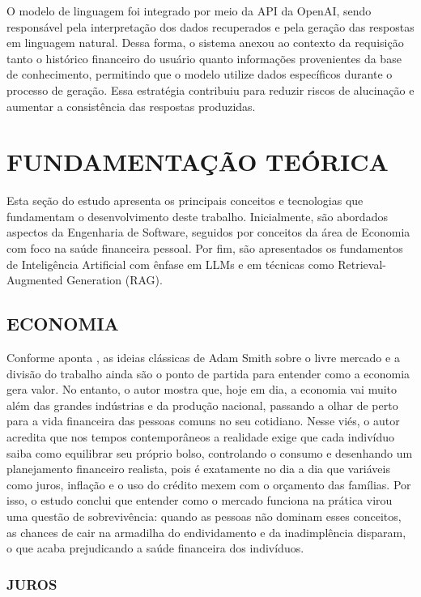 \documentclass[12pt]{article}
\begin{document}
    O modelo de linguagem foi integrado por meio da API da OpenAI, sendo responsável pela interpretação dos dados recuperados e pela geração das respostas em linguagem natural. Dessa forma, o sistema anexou ao contexto da requisição tanto o histórico financeiro do usuário quanto informações provenientes da base de conhecimento, permitindo que o modelo utilize dados específicos durante o processo de geração. Essa estratégia contribuiu para reduzir riscos de alucinação e aumentar a consistência das respostas produzidas.


\section{FUNDAMENTAÇÃO TEÓRICA}

Esta seção do estudo apresenta os principais conceitos e tecnologias que fundamentam o desenvolvimento deste trabalho. Inicialmente, são abordados aspectos da Engenharia de Software, seguidos por conceitos da área de Economia com foco na saúde financeira pessoal. Por fim, são apresentados os fundamentos de Inteligência Artificial com ênfase em LLMs e em técnicas como Retrieval-Augmented Generation (RAG).

  \subsection{ECONOMIA}
  Conforme aponta \cite{marchevsky2023gramatica}, as ideias clássicas de Adam Smith sobre o livre mercado e a divisão do trabalho ainda são o ponto de partida para entender como a economia gera valor. No entanto, o autor mostra que, hoje em dia, a economia vai muito além das grandes indústrias e da produção nacional, passando a olhar de perto para a vida financeira das pessoas comuns no seu cotidiano. Nesse viés, o autor acredita que nos tempos contemporâneos a realidade exige que cada indivíduo saiba como equilibrar seu próprio bolso, controlando o consumo e desenhando um planejamento financeiro realista, pois é exatamente no dia a dia que variáveis como juros, inflação e o uso do crédito mexem com o orçamento das famílias. Por isso, o estudo conclui que entender como o mercado funciona na prática virou uma questão de sobrevivência: quando as pessoas não dominam esses conceitos, as chances de cair na armadilha do endividamento e da inadimplência disparam, o que acaba prejudicando a saúde financeira dos indivíduos.

    \subsubsection{JUROS}
\end{document}
